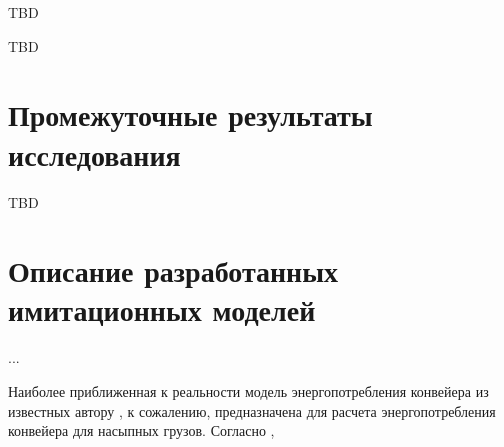 \documentclass[specification,annotation,times]{itmo-student-thesis}
\theoremstyle{definition}
\begin{document}
\chapterconclusion

TBD

\startconclusionpage

TBD

\printmainbibliography

\appendix

\chapter{Промежуточные результаты исследования}\label{apx:bad-results}

TBD

\chapter{Описание разработанных имитационных моделей}\label{apx:simulators}

...

Наиболее приближенная к реальности модель энергопотребления конвейера из
известных автору \cite{zhang2011modeling}, к сожалению, предназначена для расчета энергопотребления
конвейера для насыпных грузов.
Согласно , 
\end{document}
